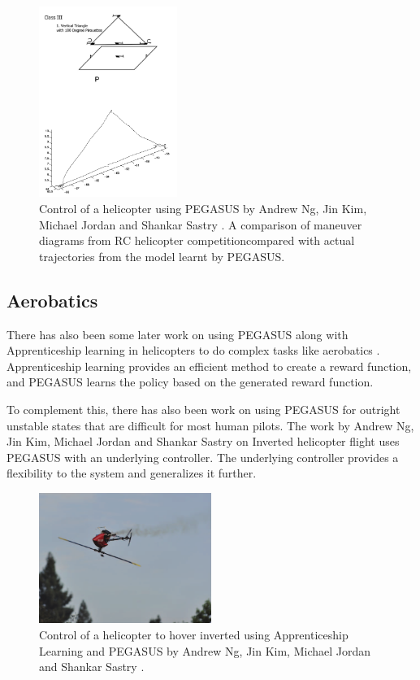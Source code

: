 \documentclass[hidelinks,BTech]{iitmdiss}
\begin{document}
\begin{figure}[H]
  \centering
    \includegraphics[width=0.4\textwidth]{pegasus_helicopter.png}
    \caption{Control of a helicopter using PEGASUS by Andrew Ng, Jin Kim, Michael Jordan and Shankar Sastry \cite{HelicopterPegasus}. A comparison of maneuver diagrams from RC helicopter competition\protect\footnotemark \space compared with actual trajectories from the model learnt by PEGASUS.}
\end{figure}

\subsection{Aerobatics}

There has also been some later work on using PEGASUS along with Apprenticeship learning in helicopters to do complex tasks like aerobatics \cite{ApprenticeshipHelicopterAerobatics}. Apprenticeship learning provides an efficient method to create a reward function, and PEGASUS learns the policy based on the generated reward function.

To complement this, there has also been work on using PEGASUS for outright unstable states that are difficult for most human pilots. The work by Andrew Ng, Jin Kim, Michael Jordan and Shankar Sastry on Inverted helicopter flight \cite{InvertedHelicopterFlight} uses PEGASUS with an underlying controller. The underlying controller provides a flexibility to the system and generalizes it further.

\begin{figure}[H]
  \centering
    \includegraphics[width=0.5\textwidth]{pegasus_inverted_helicopter.png}
    \caption{Control of a helicopter to hover inverted using Apprenticeship Learning and PEGASUS by Andrew Ng, Jin Kim, Michael Jordan and Shankar Sastry \cite{InvertedHelicopterFlight}.}
\end{figure}
\end{document}
